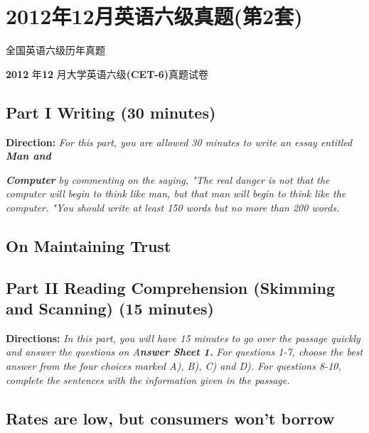 \documentclass[UTF8,11pt]{ctexart}
\begin{document}
\section*{2012年12月英语六级真题(第2套)}
全国英语六级历年真题


\textbf{2012} 年\textbf{12} 月大学英语六级\textbf{(CET-6)}真题试卷


\subsection*{\textbf{Part I} \textbf{Writing} \textbf{(30 minutes)}}


\textbf{Direction:}\textit{ For this part, you are allowed 30 minutes to write an essay entitled}\textbf{\textit{ Man and}}


\textbf{\textit{Computer}}\textit{ by commenting on the saying, "The real danger is not that the computer will} \textit{begin to think like man, but that man will begin to think like the computer. "You should} \textit{write at least 150 words but no more than 200 words.}


\subsection*{\textbf{On Maintaining Trust}}


\subsection*{\textbf{Part II Reading Comprehension (Skimming and Scanning) (15 minutes)}}


\textbf{Directions:}\textit{ In this part, you will have 15 minutes to go over the passage quickly and answer the} \textit{questions on A}\textbf{\textit{nswer Sheet 1.}}\textit{ For questions 1-7, choose the best answer from the four} \textit{choices marked A), B), C) and D). For questions 8-10, complete the sentences with the} \textit{information given in the passage.}


\subsection*{\textbf{Rates are low, but consumers won’t borrow}}
\end{document}
